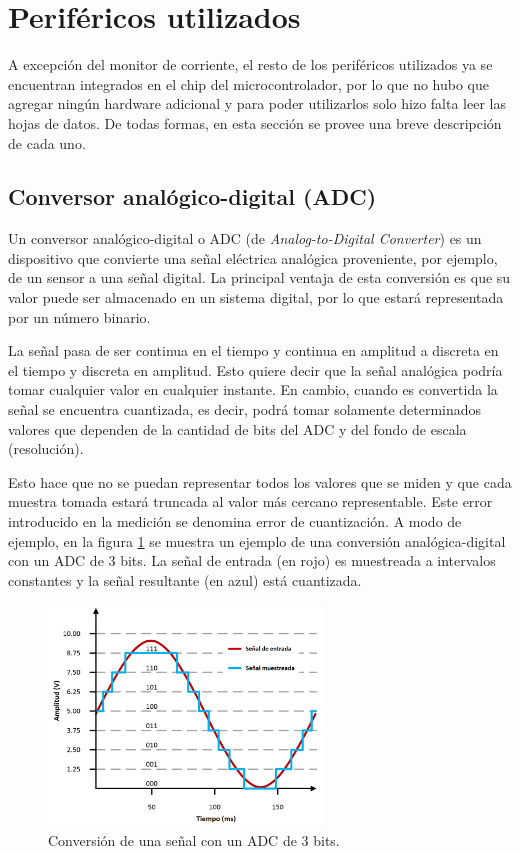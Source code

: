 \section{Periféricos utilizados}

A excepción del monitor de corriente, el resto de los periféricos utilizados ya se encuentran integrados en el chip del microcontrolador, por lo que no hubo que agregar ningún hardware adicional y para poder utilizarlos solo hizo falta leer las hojas de datos. De todas formas, en esta sección se provee una breve descripción de cada uno.

\subsection{Conversor analógico-digital (ADC)}

Un conversor analógico-digital o ADC (de \textit{Analog-to-Digital Converter}) es un dispositivo que convierte una señal eléctrica analógica proveniente, por ejemplo, de un sensor a una señal digital. La principal ventaja de esta conversión es que su valor puede ser almacenado en un sistema digital, por lo que estará representada por un número binario.

La señal pasa de ser continua en el tiempo y continua en amplitud a discreta en el tiempo y discreta en amplitud. Esto quiere decir que la señal analógica podría tomar cualquier valor en cualquier instante. En cambio, cuando es convertida la señal se encuentra cuantizada, es decir, podrá tomar solamente determinados valores que dependen de la cantidad de bits del ADC y del fondo de escala (resolución).

Esto hace que no se puedan representar todos los valores que se miden y que cada muestra tomada estará truncada al valor más cercano representable. Este error introducido en la medición se denomina error de cuantización. A modo de ejemplo, en la figura \ref{fig:muestreoADC} se muestra un ejemplo de una conversión analógica-digital con un ADC de 3 bits. La señal de entrada (en rojo) es muestreada a intervalos constantes y la señal resultante (en azul) está cuantizada.

\begin{figure}[H]
\centering
\includegraphics[width=0.65\textwidth]{./Figures/muestreo.png}
\caption{Conversión de una señal con un ADC de 3 bits.}
\label{fig:muestreoADC}
\end{figure}

